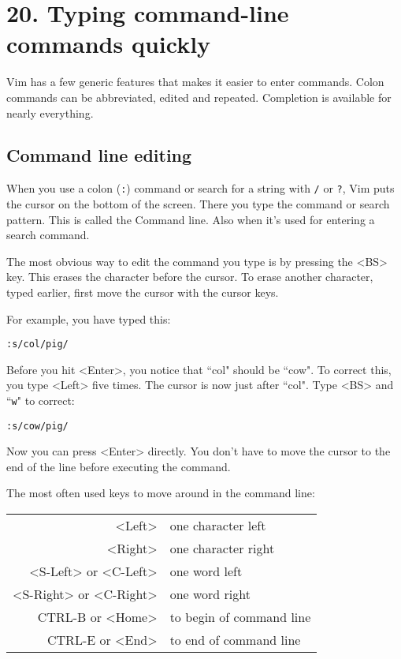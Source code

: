 \section{20. Typing command-line commands quickly}
Vim has a few generic features that makes it easier to enter commands.  Colon
commands can be abbreviated, edited and repeated.  Completion is available for
nearly everything.
\localtableofcontents
\subsection{Command line editing}
When you use a colon (\texttt{:}) command or search for a string with \texttt{/} or \texttt{?}, Vim puts the cursor on the bottom of the screen.
There you type the command or search pattern.
This is called the Command line.
Also when it's used for entering a search command.

The most obvious way to edit the command you type is by pressing the <BS> key.
This erases the character before the cursor.
To erase another character, typed earlier, first move the cursor with the cursor keys.

For example, you have typed this:

\begin{Verbatim}[samepage=true]
 :s/col/pig/
\end{Verbatim}

Before you hit <Enter>, you notice that ``col" should be ``cow".
To correct this, you type <Left> five times.
The cursor is now just after ``col".
Type <BS> and ``\texttt{w}" to correct:

\begin{Verbatim}[samepage=true]
 :s/cow/pig/
\end{Verbatim}

Now you can press <Enter> directly.
You don't have to move the cursor to the end of the line before executing the command.

The most often used keys to move around in the command line:

\begin{center} \begin{longtable}{r l}
				<Left> & one character left \\
				<Right> & one character right\\
				<S-Left> or <C-Left> & one word left\\
				<S-Right> or <C-Right> & one word right\\
				CTRL-B or <Home> & to begin of command line\\
				CTRL-E or <End> & to end of command line\\
\end{longtable} \end{center}

